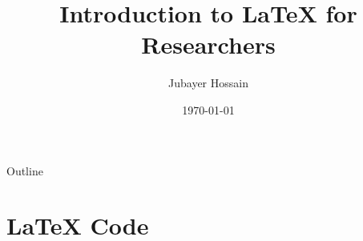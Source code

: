 \documentclass[dvipsnames, aspectratio=169]{beamer}
\title{Introduction to {\LaTeX} for Researchers}
\author[Jubayer Hossain]{\Large Jubayer Hossain}
\institute[HDRO]{\Large Health Data Research Organization}
\date{\today}
\begin{document}
	\begin{frame}
		\maketitle 
	\end{frame}

	\begin{frame}[t]{Outline}
		\tableofcontents 
	\end{frame}

	\section{{\LaTeX} Code} 
	\begin{frame}
	
	\end{frame}
	
\end{document}
